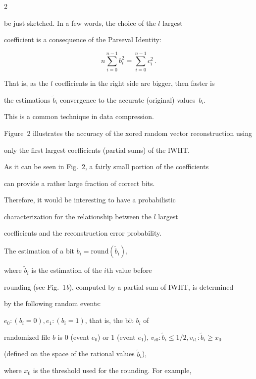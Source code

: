 \begin{multicols}{2}
\noindent

 be just sketched. In a few words, the choice of the $l$ largest 

coefficient is a consequence of the Parseval Identity:

$$ n\sum\limits_{i=0}^{n-1} b_i^2 =\sum\limits_{i=0}^{n-1} c_i ^2\,.

$$

 That is, as the $l$ coefficients in the right side are bigger, then faster is 

 the estimations $\tilde b_i$ convergence to the accurate (original) values~$b_i$.

 This is a common technique in data compression.



Figure~2 illustrates the accuracy of the xored random vector reconstruction using 

only the first largest coefficients (partial sums) of the IWHT.





As it can be seen in Fig.~2, a fairly small portion of the coefficients 

can provide a rather large fraction of correct bits.

Therefore, it would be interesting to have a probabilistic 

characterization for the relationship between the $l$ largest 

coefficients and the reconstruction error probability.





The  estimation of a bit $b_i = \mathrm{round}\left(\tilde b_i\right)$,

where $\tilde b_i$ is the estimation of the $i$th value before

rounding (see Fig.~1\textit{b}), computed by a partial sum of IWHT, is determined

by the following random events:



$e_0:( b_i =0), e_1:( b_i =1)$, that is, the bit $b_i$ of

randomized file $b$ is $0$ (event $e_0$) or $1$ (event $e_1$), $

v_{i0}: {\tilde b_i \le 1/2}, v_{i1}:{\tilde b_i \ge x_0}$

(defined on the space of the rational values  $\tilde b_i$), 

where $x_0$ is the threshold used for the rounding. For example, 


\end{multicols}
